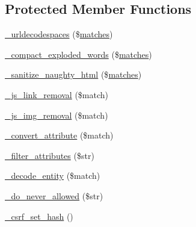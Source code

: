 \subsection*{Protected Member Functions}
\begin{DoxyCompactItemize}
\item 
\mbox{\hyperlink{class_c_i___security_aed66bb1c40ccc25c96326da7c0e2088a}{\+\_\+urldecodespaces}} (\$\mbox{\hyperlink{_functions_8php_a8968a55c84671473daa2233e6cae65b8}{matches}})
\item 
\mbox{\hyperlink{class_c_i___security_adfb0e251ae35ae40303a302d253c3ab2}{\+\_\+compact\+\_\+exploded\+\_\+words}} (\$\mbox{\hyperlink{_functions_8php_a8968a55c84671473daa2233e6cae65b8}{matches}})
\item 
\mbox{\hyperlink{class_c_i___security_af67689597607833df370031fb799c92b}{\+\_\+sanitize\+\_\+naughty\+\_\+html}} (\$\mbox{\hyperlink{_functions_8php_a8968a55c84671473daa2233e6cae65b8}{matches}})
\item 
\mbox{\hyperlink{class_c_i___security_a6b1744acaf85e05c65ab17242dea4f06}{\+\_\+js\+\_\+link\+\_\+removal}} (\$match)
\item 
\mbox{\hyperlink{class_c_i___security_a5c5e91dc8e3df0174e4e074dd375a8db}{\+\_\+js\+\_\+img\+\_\+removal}} (\$match)
\item 
\mbox{\hyperlink{class_c_i___security_ae16451bcdc769285c499cbf8068b3523}{\+\_\+convert\+\_\+attribute}} (\$match)
\item 
\mbox{\hyperlink{class_c_i___security_aa385a9c7527f5eece656b9cac73979d3}{\+\_\+filter\+\_\+attributes}} (\$str)
\item 
\mbox{\hyperlink{class_c_i___security_a5289832cb3ae9cee3c12e82ede958874}{\+\_\+decode\+\_\+entity}} (\$match)
\item 
\mbox{\hyperlink{class_c_i___security_a61217e43f888cdf8afb1fba16b5cd9f6}{\+\_\+do\+\_\+never\+\_\+allowed}} (\$str)
\item 
\mbox{\hyperlink{class_c_i___security_a7064dd5501c1dfab05ba6ac8838beb01}{\+\_\+csrf\+\_\+set\+\_\+hash}} ()
\end{DoxyCompactItemize}
